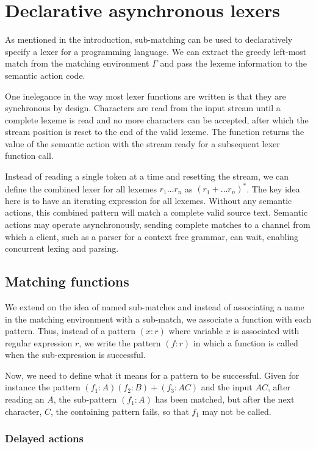 \section{Declarative asynchronous lexers}
\label{lexer}

As mentioned in the introduction, sub-matching can be used to declaratively
specify a lexer for a programming language. We can extract the greedy left-most
match from the matching environment $\Gamma$ and pass the lexeme information to
the semantic action code.

One inelegance in the way most lexer functions are written is that they are
synchronous by design. Characters are read from the input stream until a
complete lexeme is read and no more characters can be accepted, after which the
stream position is reset to the end of the valid lexeme. The function returns
the value of the semantic action with the stream ready for a subsequent lexer
function call.

Instead of reading a single token at a time and resetting the stream, we can
define the combined lexer for all lexemes $r_1 \dots r_n$ as $(r_1 + \dots
r_n)^*$. The key idea here is to have an iterating expression for all lexemes.
Without any semantic actions, this combined pattern will match a complete valid
source text. Semantic actions may operate asynchronously, sending complete
matches to a channel from which a client, such as a parser for a context free
grammar, can wait, enabling concurrent lexing and parsing.


\subsection{Matching functions}

We extend on the idea of named sub-matches and instead of associating a name in
the matching environment with a sub-match, we associate a function with each
pattern. Thus, instead of a pattern $(x:r)$ where variable $x$ is associated
with regular expression $r$, we write the pattern $(f:r)$ in which a function is
called when the sub-expression is successful.

Now, we need to define what it means for a pattern to be successful. Given for
instance the pattern $(f_1:A)(f_2:B)+(f_3:AC)$ and the input $AC$, after reading
an $A$, the sub-pattern $(f_1:A)$ has been matched, but after the next
character, $C$, the containing pattern fails, so that $f_1$ may not be called.

\subsubsection{Delayed actions}

